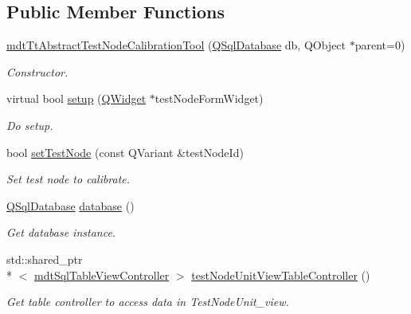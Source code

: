 \subsection*{Public Member Functions}
\begin{DoxyCompactItemize}
\item 
\hyperlink{classmdt_tt_abstract_test_node_calibration_tool_af74473766d512098c3e528e4f5865ade}{mdt\-Tt\-Abstract\-Test\-Node\-Calibration\-Tool} (\hyperlink{class_q_sql_database}{Q\-Sql\-Database} db, Q\-Object $\ast$parent=0)
\begin{DoxyCompactList}\small\item\em Constructor. \end{DoxyCompactList}\item 
virtual bool \hyperlink{classmdt_tt_abstract_test_node_calibration_tool_a89e27cd930547aef0ba143519408ce1b}{setup} (\hyperlink{class_q_widget}{Q\-Widget} $\ast$test\-Node\-Form\-Widget)
\begin{DoxyCompactList}\small\item\em Do setup. \end{DoxyCompactList}\item 
bool \hyperlink{classmdt_tt_abstract_test_node_calibration_tool_a85c47fe2b501769f5966a27aeb3f051a}{set\-Test\-Node} (const Q\-Variant \&test\-Node\-Id)
\begin{DoxyCompactList}\small\item\em Set test node to calibrate. \end{DoxyCompactList}\item 
\hyperlink{class_q_sql_database}{Q\-Sql\-Database} \hyperlink{classmdt_tt_abstract_test_node_calibration_tool_abd953e46ec2e7d2295ec03cd697ffd7e}{database} ()
\begin{DoxyCompactList}\small\item\em Get database instance. \end{DoxyCompactList}\item 
std\-::shared\-\_\-ptr\\*
$<$ \hyperlink{classmdt_sql_table_view_controller}{mdt\-Sql\-Table\-View\-Controller} $>$ \hyperlink{classmdt_tt_abstract_test_node_calibration_tool_a0d11cc7bad0c02615b2d636a67de5c76}{test\-Node\-Unit\-View\-Table\-Controller} ()
\begin{DoxyCompactList}\small\item\em Get table controller to access data in Test\-Node\-Unit\-\_\-view. \end{DoxyCompactList}\item 

\end{DoxyCompactItemize}
